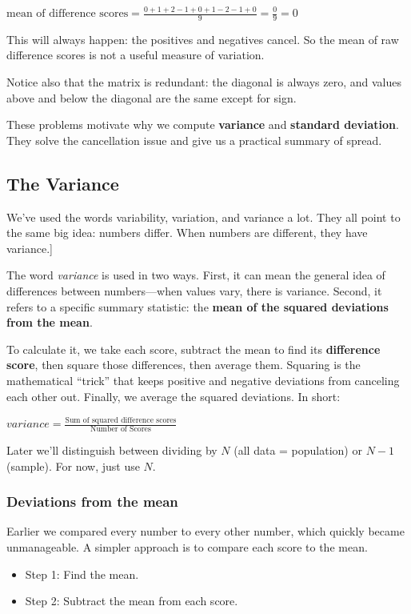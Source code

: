 \documentclass[
  letterpaper,
  DIV=11,
  numbers=noendperiod]{scrreprt}
\begin{document}
\(\text{mean of difference scores} = \frac{0+1+2-1+0+1-2-1+0}{9} = \frac{0}{9} = 0\)

This will always happen: the positives and negatives cancel. So the mean
of raw difference scores is not a useful measure of variation.

Notice also that the matrix is redundant: the diagonal is always zero,
and values above and below the diagonal are the same except for sign.

These problems motivate why we compute \textbf{variance} and
\textbf{standard deviation}. They solve the cancellation issue and give
us a practical summary of spread.

\subsection{The Variance}\label{the-variance}

We've used the words variability, variation, and variance a lot. They
all point to the same big idea: numbers differ. When numbers are
different, they have variance.{]}

The word \emph{variance} is used in two ways. First, it can mean the
general idea of differences between numbers---when values vary, there is
variance. Second, it refers to a specific summary statistic: the
\textbf{mean of the squared deviations from the mean}.

To calculate it, we take each score, subtract the mean to find its
\textbf{difference score}, then square those differences, then average
them. Squaring is the mathematical ``trick'' that keeps positive and
negative deviations from canceling each other out. Finally, we average
the squared deviations. In short:

\(variance = \frac{\text{Sum of squared difference scores}}{\text{Number of Scores}}\)

Later we'll distinguish between dividing by \(N\) (all data =
population) or \(N-1\) (sample). For now, just use \(N\).

\subsubsection{Deviations from the mean}\label{deviations-from-the-mean}

Earlier we compared every number to every other number, which quickly
became unmanageable. A simpler approach is to compare each score to the
mean.

\begin{itemize}
\item
  Step 1: Find the mean.
\item
  Step 2: Subtract the mean from each score.
\end{itemize}
\end{document}
